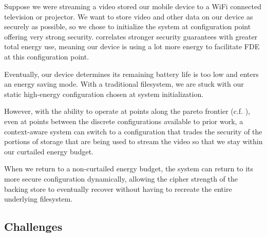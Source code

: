  Suppose we were streaming a video stored our mobile
device to a WiFi connected television or projector. We want to store video and
other data on our device as securely as possible, so we chose to initialize the
system at configuration point offering very strong security.
 correlates stronger security guarantees with
greater total energy use, meaning our device is using a lot more energy to
facilitate FDE at this configuration point.

Eventually, our device determines its remaining battery life is too low and
enters an energy saving mode. With a traditional filesystem, we are stuck with
our static high-energy configuration chosen at system initialization.

However, with the ability to operate at points along the pareto frontier (c.f.
), even at points between the discrete
configurations available to prior work, a context-aware system can switch to a
configuration that trades the security of the portions of storage that are being
used to stream the video so that we stay within our curtailed energy budget.

When we return to a non-curtailed energy budget, the system can return to its
more secure configuration dynamically, allowing the cipher strength of the
backing store to eventually recover without having to recreate the entire
underlying filesystem.\\


\subsection{Challenges}

